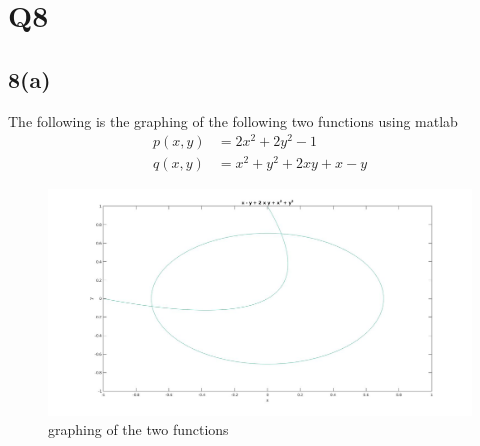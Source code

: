 \documentclass{article}
\begin{document}
\section{Q8}
\subsection*{8(a)}
The following is the graphing of the following two functions using matlab
\begin{equation*}
\begin{aligned}
p(x,y) &= 2x^2 +2y^2 -1\\
q(x,y) &= x^2 + y^2 + 2xy + x - y
\end{aligned}
\end{equation*}
\begin{figure}[H]
\centering
\includegraphics[width=5in]{p8-1.jpg}
\caption{graphing of the two functions}
\end{figure}
\end{document}
